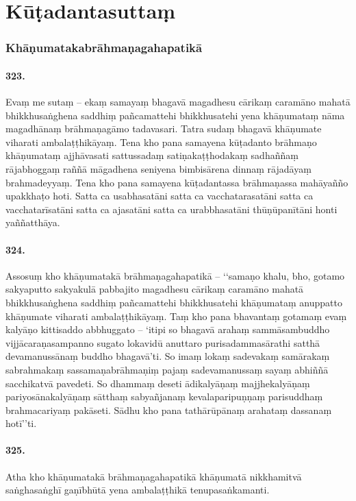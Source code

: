 \section{Kūṭadantasuttaṃ}

\subsubsection{Khāṇumatakabrāhmaṇagahapatikā}

\paragraph{323.} Evaṃ me sutaṃ – ekaṃ samayaṃ bhagavā magadhesu cārikaṃ caramāno mahatā bhikkhusaṅghena saddhiṃ pañcamattehi bhikkhusatehi yena khāṇumataṃ nāma magadhānaṃ brāhmaṇagāmo tadavasari. Tatra sudaṃ bhagavā khāṇumate viharati ambalaṭṭhikāyaṃ. Tena kho pana samayena kūṭadanto brāhmaṇo khāṇumataṃ ajjhāvasati sattussadaṃ satiṇakaṭṭhodakaṃ sadhaññaṃ rājabhoggaṃ raññā māgadhena seniyena bimbisārena dinnaṃ rājadāyaṃ brahmadeyyaṃ. Tena kho pana samayena kūṭadantassa brāhmaṇassa mahāyañño upakkhaṭo hoti. Satta ca usabhasatāni satta ca vacchatarasatāni satta ca vacchatarīsatāni satta ca ajasatāni satta ca urabbhasatāni thūṇūpanītāni honti yaññatthāya.

\paragraph{324.} Assosuṃ kho khāṇumatakā brāhmaṇagahapatikā – ‘‘samaṇo khalu, bho, gotamo sakyaputto sakyakulā pabbajito magadhesu cārikaṃ caramāno mahatā bhikkhusaṅghena saddhiṃ pañcamattehi bhikkhusatehi khāṇumataṃ anuppatto khāṇumate viharati ambalaṭṭhikāyaṃ. Taṃ kho pana bhavantaṃ gotamaṃ evaṃ kalyāṇo kittisaddo abbhuggato – ‘itipi so bhagavā arahaṃ sammāsambuddho vijjācaraṇasampanno sugato lokavidū anuttaro purisadammasārathi satthā devamanussānaṃ buddho bhagavā’ti. So imaṃ lokaṃ sadevakaṃ samārakaṃ sabrahmakaṃ sassamaṇabrāhmaṇiṃ pajaṃ sadevamanussaṃ sayaṃ abhiññā sacchikatvā pavedeti. So dhammaṃ deseti ādikalyāṇaṃ majjhekalyāṇaṃ pariyosānakalyāṇaṃ sātthaṃ sabyañjanaṃ kevalaparipuṇṇaṃ parisuddhaṃ brahmacariyaṃ pakāseti. Sādhu kho pana tathārūpānaṃ arahataṃ dassanaṃ hotī’’ti.

\paragraph{325.} Atha kho khāṇumatakā brāhmaṇagahapatikā khāṇumatā nikkhamitvā saṅghasaṅghī gaṇībhūtā yena ambalaṭṭhikā tenupasaṅkamanti.

